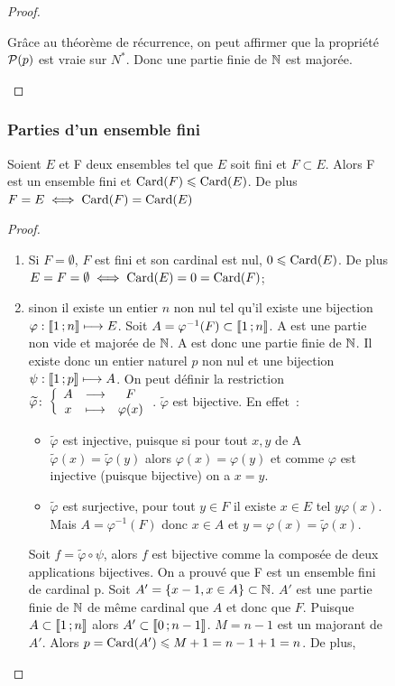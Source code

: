 \begin{figure}
\begin{proof}
\begin{itemize}
Grâce au théorème de récurrence, on peut affirmer que la propriété \(\P(p)\) est vraie sur \(N^*\). Donc une partie finie de \(\N\) est majorée.
  \end{itemize}
\end{proof}

\subsubsection{Parties d'un ensemble fini}

\begin{theo}\label{theo:partiesfinies}
  Soient \(E\) et F deux ensembles tel que \(E\) soit fini et \(F\subset E\). Alors F est un ensemble fini et \(\Card(F)\leqslant\Card(E)\). De plus \(F=E \iff \Card(F)=\Card(E)\)
\end{theo}
\begin{proof}
  \begin{enumerate}
  \item Si \(F=\emptyset\), \(F\) est fini et son cardinal est nul, \(0\leqslant\Card(E)\). De plus \(E=F=\emptyset \iff \Card(E)=0=\Card(F)\);
  \item sinon il existe un entier \(n\) non nul tel qu'il existe une bijection \(\varphi:\intervalleentier{1}{n} \longmapsto E\). Soit \(A=\varphi^{-1}(F) \subset\intervalleentier{1}{n}\). A est une partie non vide et majorée de \(\N\). A est donc une partie finie de \(\N\). Il existe donc un entier naturel \(p\) non nul et une bijection \(\psi:\intervalleentier{1}{p} \longmapsto A\). On peut définir la restriction \(\fonction{\widetilde{\varphi}}{A}{F}{x}{\varphi(x)}\). \(\widetilde{\varphi}\) est bijective. En effet~:
    \begin{itemize}
    \item \(\widetilde{\varphi}\) est injective, puisque si pour tout \(x,y\) de A \(\widetilde{\varphi}(x)=\widetilde{\varphi}(y)\) alors \(\varphi(x)=\varphi(y)\) et comme \(\varphi\) est injective (puisque bijective) on a \(x=y\).
    \item \(\widetilde{\varphi}\) est surjective, pour tout \(y\in F\) il existe \(x\in E\) tel \(y\varphi(x)\). Mais \(A=\varphi^{-1}(F)\) donc \(x\in A\) et \(y=\varphi(x)=\widetilde{\varphi}(x)\).
    \end{itemize}
    Soit \(f=\widetilde{\varphi}\circ \psi\), alors \(f\) est bijective comme la composée de deux applications bijectives. On a prouvé que F est un ensemble fini de cardinal p. Soit \(A'=\{x-1, x\in A\}\subset \N\). \(A'\) est une partie finie de \(\N\) de même cardinal que \(A\) et donc que \(F\). Puisque \(A\subset\intervalleentier{1}{n}\) alors \(A'\subset\intervalleentier{0}{n-1}\). \(M=n-1\) est un majorant de \(A'\). Alors \(p=\Card(A')\leqslant M+1=n-1+1=n\). De plus, 

\end{enumerate}
\end{proof}
\end{figure}
